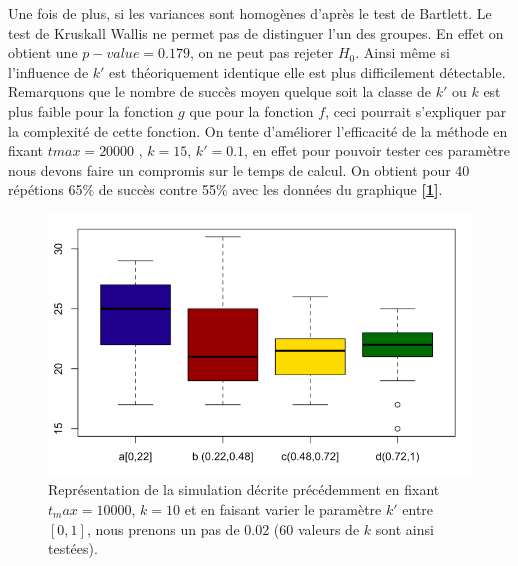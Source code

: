 \documentclass[12pt]{article}
\begin{document}
\begin{minipage}{0.5\textwidth}
 Une fois de plus, si les variances sont homogènes d'après le test de Bartlett. Le test de Kruskall Wallis  ne permet pas de distinguer l'un des groupes. En effet on obtient une $p-value = 0.179$, on ne peut pas rejeter $H_0$. Ainsi même si l'influence de $k'$ est théoriquement identique elle est plus difficilement détectable. Remarquons que le nombre de succès moyen quelque soit la classe de $k'$ ou $k$ est plus faible pour la fonction $g$ que pour la fonction $f$, ceci pourrait s'expliquer par la complexité de cette fonction. On tente d'améliorer l'efficacité de la méthode en fixant $tmax =20000$ , $k=15$, $k' = 0.1$, en effet pour pouvoir tester ces paramètre nous devons faire un compromis sur le temps de calcul. On obtient pour 40 répétions  65\% de succès contre 55\% avec les données du graphique \textbf{[\ref{Q2KP}]}.
\end{minipage} \hfill
\begin{minipage}{0.45\textwidth}
\begin{figure}[H]
\includegraphics[width=1\textwidth]{nSKPG.png}
\caption{Représentation de la simulation décrite précédemment en fixant $t_max=10000$, $k=10$ et en faisant varier le paramètre $k'$ entre $[0,1]$, nous prenons un pas de 0.02 (60 valeurs de $k$ sont ainsi testées).}
\label{Q2KP}
\end{figure}
\end{minipage}
\end{document}
